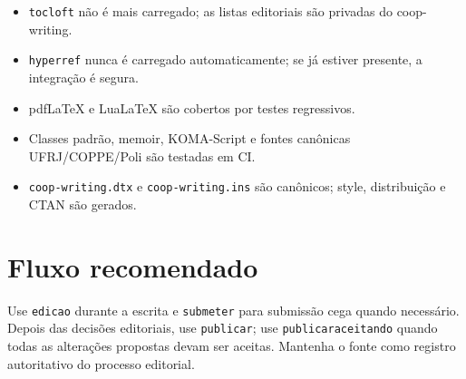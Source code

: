 \documentclass[11pt]{article}
\newcommand{\opt}[1]{\texttt{#1}}
\begin{document}
\begin{itemize}
\item \texttt{tocloft} não é mais carregado; as listas editoriais são privadas do coop-writing.
\item \texttt{hyperref} nunca é carregado automaticamente; se já estiver presente, a integração é segura.
\item pdfLaTeX e LuaLaTeX são cobertos por testes regressivos.
\item Classes padrão, memoir, KOMA-Script e fontes canônicas UFRJ/COPPE/Poli são testadas em CI.
\item \texttt{coop-writing.dtx} e \texttt{coop-writing.ins} são canônicos; style, distribuição e CTAN são gerados.
\end{itemize}

\section*{Fluxo recomendado}

Use \opt{edicao} durante a escrita e \opt{submeter} para submissão cega quando necessário. Depois das decisões editoriais, use \opt{publicar}; use \opt{publicaraceitando} quando todas as alterações propostas devam ser aceitas. Mantenha o fonte como registro autoritativo do processo editorial.
\end{document}
